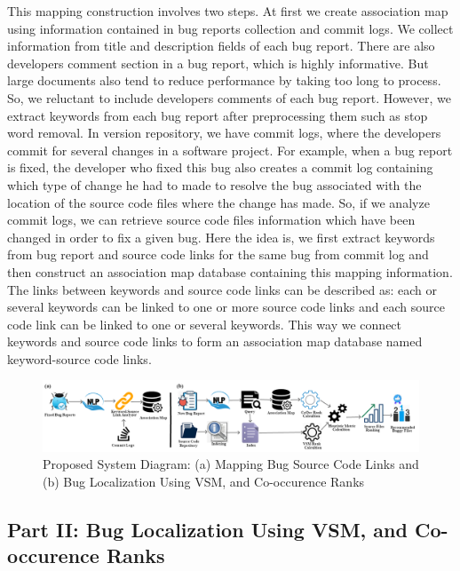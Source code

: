 \documentclass[conference]{IEEEtran}
\begin{document}
This mapping construction involves two steps.
At first we create association map using information contained in bug reports collection and commit logs. We collect information from title and description fields of each bug report. There are also developers comment section in a bug report, which is highly informative. But large documents also tend to reduce performance by taking too long to process. So, we reluctant to include developers comments of each bug report. However, we extract keywords from each bug report after preprocessing them such as stop word removal. 
In version repository, we have commit logs, where the developers commit for several changes in a software project. For example, when a bug report is fixed, the developer who fixed this bug also creates a commit log containing which type of change he had to made to resolve the bug associated with the location of the source code files where the change has made. So, if we analyze commit logs, we can retrieve source code files information which have been changed in order to fix a given bug. Here the idea is, we first extract keywords from bug report and source code links for the same bug from commit log and then construct an association map database containing this mapping information. The links between keywords and source code links can be described as: each or several keywords can be linked to one or more source code links and each source code link can be linked to one or several keywords. This way we connect keywords and source code links to form an association map database named keyword-source code links. 




\begin{figure}
	\centering
	\includegraphics[scale=0.65]{SD3}
	\caption{Proposed System Diagram: (a) Mapping Bug Source Code Links and  (b) Bug Localization Using VSM, and Co-occurence Ranks}
	\label{fig:systemDiagram}
\end{figure}

\subsection{Part II: Bug Localization Using VSM, and Co-occurence Ranks}
\end{document}
